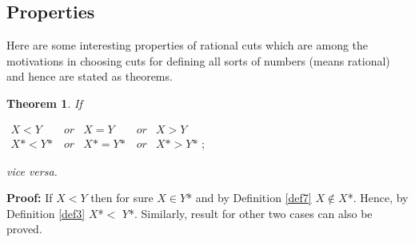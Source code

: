 \documentclass[12pt,a4paper,final,titlepage]{article}
\newtheorem{thm}{Theorem}
\begin{document}
\subsection{Properties}
Here are some interesting properties of rational cuts which are among the motivations in choosing cuts for defining all sorts of numbers (means rational) and hence are stated as theorems.

\begin{thm} \label{thm11}
If

$
\begin{array}{lll}
X<Y \qquad or & X=Y \qquad or & X>Y \\
X\text{*}<Y\text{*} \quad or & X\text{*}=Y\text{*} \quad or & X\text{*}>Y\text{* ;}
\end{array}
$

 vice versa.
\end{thm}

\textbf{Proof:} If $X<Y$ then for sure $X\in Y$* and by Definition \ref{def7} $X\notin X$*. Hence, by Definition \ref{def3} $X$*$<$ $Y$*. Similarly, result for other two cases can also be proved.

\bigskip
\end{document}
